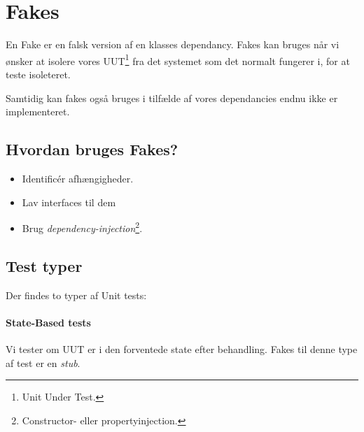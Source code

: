 \section{Fakes}

En Fake er en falsk version af en klasses dependancy. Fakes kan bruges når vi ønsker at isolere vores UUT\footnote{Unit Under Test.} fra det systemet som det normalt fungerer i, for at teste isoleteret.

Samtidig kan fakes også bruges i tilfælde af vores dependancies endnu ikke er implementeret.

%

\subsection{Hvordan bruges Fakes?}

\begin{itemize}
	\item Identificér afhængigheder.
	\item Lav interfaces til dem
	\item Brug \textit{dependency-injection}\footnote{Constructor- eller propertyinjection.}.
\end{itemize}

\subsection{Test typer}
Der findes to typer af Unit tests:

\paragraph{State-Based tests} Vi tester om UUT er i den forventede state efter behandling. Fakes til denne type af test er en \textit{stub}. \\

